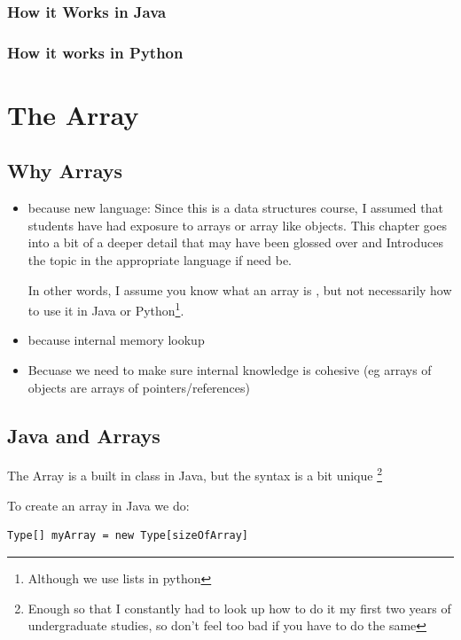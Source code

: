 \documentclass[10pt,a4paper]{book}
\begin{document}
\subsection{How it Works in Java}

\subsection{How it works in Python}


\chapter{The Array}

\section{Why Arrays}

\begin{itemize}
	\item because new language: 
	Since this is a data structures course, I assumed that students have had exposure to arrays or array like objects.
	This chapter goes into a bit of a deeper detail that may have been glossed over and Introduces the topic in the appropriate language if need be.
	
	In other words, I assume you know what an array is , but not necessarily how to use it in Java or Python\footnote{Although we use lists in python}.
	\item  because internal memory lookup
	\item Becuase we need to make sure internal knowledge is cohesive (eg arrays of objects are arrays of pointers/references)
\end{itemize}







\section{Java and Arrays}
The Array is a built in class in Java, but the syntax is a bit unique \footnote{Enough so that I constantly had to look up how to do it my first two years of undergraduate studies, so don't feel too bad if you have to do the same}

To create an array in Java we do:

\begin{verbatim}
Type[] myArray = new Type[sizeOfArray]
\end{verbatim}
\end{document}
